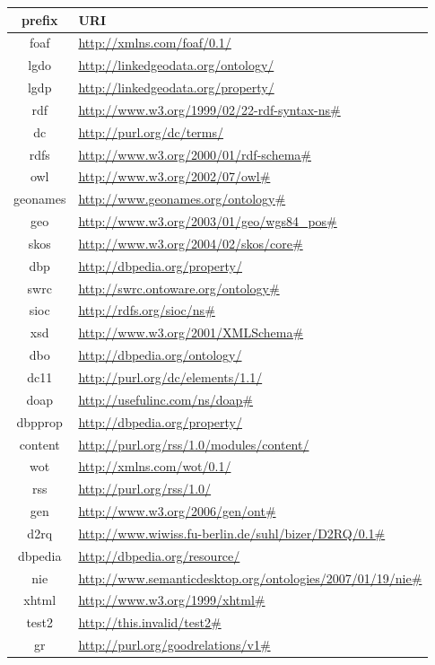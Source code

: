 \documentclass{article}
\begin{document}
\begin{longtable}{ c | p{8cm} }
  prefix & URI \\
  \hline                        
foaf & \url{http://xmlns.com/foaf/0.1/} \\
lgdo & \url{http://linkedgeodata.org/ontology/} \\
lgdp & \url{http://linkedgeodata.org/property/} \\
rdf & \url{http://www.w3.org/1999/02/22-rdf-syntax-ns#} \\
dc & \url{http://purl.org/dc/terms/} \\
rdfs & \url{http://www.w3.org/2000/01/rdf-schema#} \\
owl & \url{http://www.w3.org/2002/07/owl#} \\
geonames & \url{http://www.geonames.org/ontology#} \\
geo & \url{http://www.w3.org/2003/01/geo/wgs84_pos#} \\
skos & \url{http://www.w3.org/2004/02/skos/core#} \\
dbp & \url{http://dbpedia.org/property/} \\
swrc & \url{http://swrc.ontoware.org/ontology#} \\
sioc & \url{http://rdfs.org/sioc/ns#} \\
xsd & \url{http://www.w3.org/2001/XMLSchema#} \\
dbo & \url{http://dbpedia.org/ontology/} \\
dc11 & \url{http://purl.org/dc/elements/1.1/} \\
doap & \url{http://usefulinc.com/ns/doap#} \\
dbpprop & \url{http://dbpedia.org/property/} \\
content & \url{http://purl.org/rss/1.0/modules/content/} \\
wot & \url{http://xmlns.com/wot/0.1/} \\
rss & \url{http://purl.org/rss/1.0/} \\
gen & \url{http://www.w3.org/2006/gen/ont#} \\
d2rq & \url{http://www.wiwiss.fu-berlin.de/suhl/bizer/D2RQ/0.1#} \\
dbpedia & \url{http://dbpedia.org/resource/} \\
nie & \url{http://www.semanticdesktop.org/ontologies/2007/01/19/nie#} \\
xhtml & \url{http://www.w3.org/1999/xhtml#} \\
test2 & \url{http://this.invalid/test2#} \\
gr & \url{http://purl.org/goodrelations/v1#} \\

\end{longtable}
\end{document}
